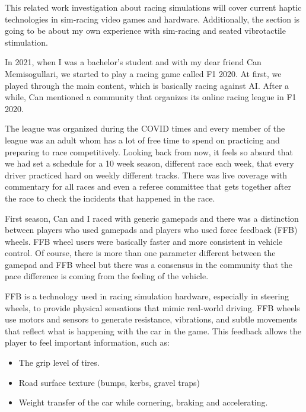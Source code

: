                 This related work investigation about racing simulations will cover current haptic technologies in sim-racing video games and hardware. Additionally, the section is going to be about my own experience with sim-racing and seated vibrotactile stimulation.\par

                In 2021, when I was a bachelor's student and with my dear friend Can Memisogullari, we started to play a racing game called F1 2020. At first, we played through the main content, which is basically racing against AI. After a while, Can mentioned a community that organizes its online racing league in F1 2020.\par
                                
                The league was organized during the COVID times and every member of the league was an adult whom has a lot of free time to spend on practicing and preparing to race competitively. Looking back from now, it feels so absurd that we had set a schedule for a 10 week season, different race each week, that every driver practiced hard on weekly different tracks. There was live coverage with commentary for all races and even a referee committee that gets together after the race to check the incidents that happened in the race.\par

                First season, Can and I raced with generic gamepads and there was a distinction between players who used gamepads and players who used force feedback (FFB) wheels. FFB wheel users were basically faster and more consistent in vehicle control. Of course, there is more than one parameter different between the gamepad and FFB wheel but there was a consensus in the community that the pace difference is coming from the feeling of the vehicle.\par

                FFB is a technology used in racing simulation hardware, especially in steering wheels, to provide physical sensations that mimic real-world driving. FFB wheels use motors and sensors to generate resistance, vibrations, and subtle movements that reflect what is happening with the car in the game. This feedback allows the player to feel important information, such as:\par

                \begin{itemize}
                    \item The grip level of tires.
                    \item Road surface texture (bumps, kerbs, gravel traps)
                    \item Weight transfer of the car while cornering, braking and accelerating.
                \end{itemize}

